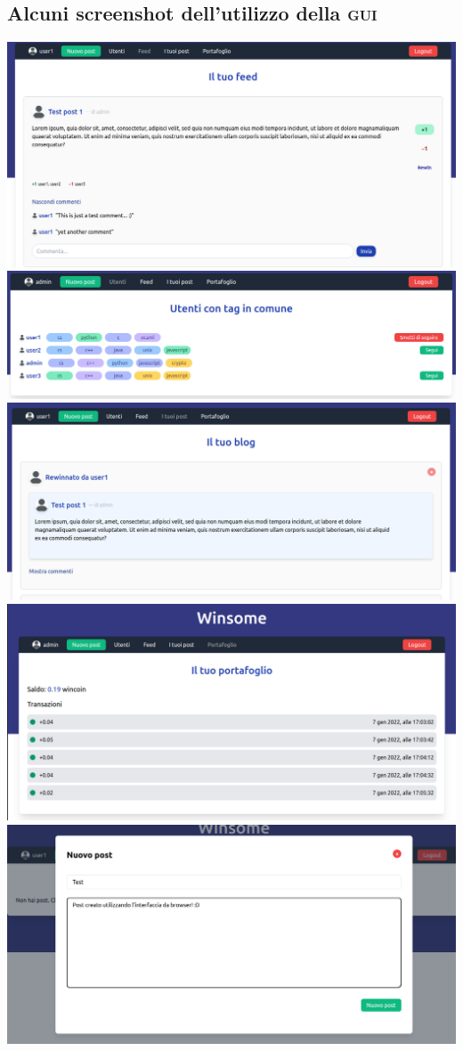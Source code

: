 \documentclass[a4paper,8pt]{article} %
\begin{document}
\subsection{Alcuni screenshot dell'utilizzo della \textsc{gui}}
\includegraphics[width=\textwidth]{feed.png}\vspace*{0.5cm}
\includegraphics[width=\textwidth]{users.png}\vspace*{0.5cm}
\includegraphics[width=\textwidth]{rewin.png}\newpage
\includegraphics[width=\textwidth]{wallet.png}\vspace*{0.4cm}
\includegraphics[width=\textwidth]{newpost.png}
\end{document}

